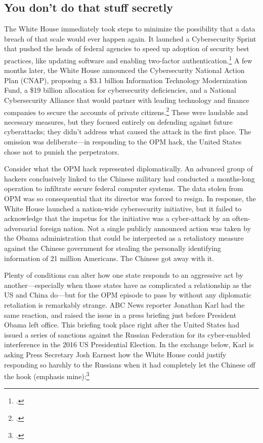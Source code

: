 \documentclass{memoir}
\begin{document}
\begin{refsegment}
\subsection{You don't do that stuff secretly}
The White House immediately took steps to minimize the possibility that a data breach of that scale would ever happen again. It launched a Cybersecurity Sprint that pushed the heads of federal agencies to speed up adoption of security best practices, like updating software and enabling two-factor authentication.\footcite{koerner_inside_2016} A few months later, the White House announced the Cybersecurity National Action Plan (CNAP), proposing a \$3.1 billion Information Technology Modernization Fund, a \$19 billion allocation for cybersecurity deficiencies, and a National Cybersecurity Alliance that would partner with leading technology and finance companies to secure the accounts of private citizens.\footcite{the_white_house_fact_2016} These were laudable and necessary measures, but they focused entirely on defending against future cyberattacks; they didn't address what caused the attack in the first place. The omission was deliberate---in responding to the OPM hack, the United States chose not to punish the perpetrators.

Consider what the OPM hack represented diplomatically. An advanced group of hackers conclusively linked to the Chinese military had conducted a months-long operation to infiltrate secure federal computer systems. The data stolen from OPM was so consequential that its director was forced to resign. In response, the White House launched a nation-wide cybersecurity initiative, but it failed to acknowledge that the impetus for the initiative was a cyber-attack by an often-adversarial foreign nation. Not a single publicly announced action was taken by the Obama administration that could be interpreted as a retaliatory measure against the Chinese government for stealing the personally identifying information of 21 million Americans. The Chinese got away with it.

Plenty of conditions can alter how one state responds to an aggressive act by another---especially when those states have as complicated a relationship as the US and China do---but for the OPM episode to pass by without any diplomatic retaliation is remarkably strange. ABC News reporter Jonathan Karl had the same reaction, and raised the issue in a press briefing just before President Obama left office. This briefing took place right after the United States had issued a series of sanctions against the Russian Federation for its cyber-enabled interference in the 2016 US Presidential Election. In the exchange below, Karl is asking Press Secretary Josh Earnest how the White House could justify responding so harshly to the Russians when it had completely let the Chinese off the hook (emphasis mine):\footcite[You can watch the full exchange via video here. It's pretty awkward.]{gill_earnest_2017}


\end{refsegment}
\end{document}
